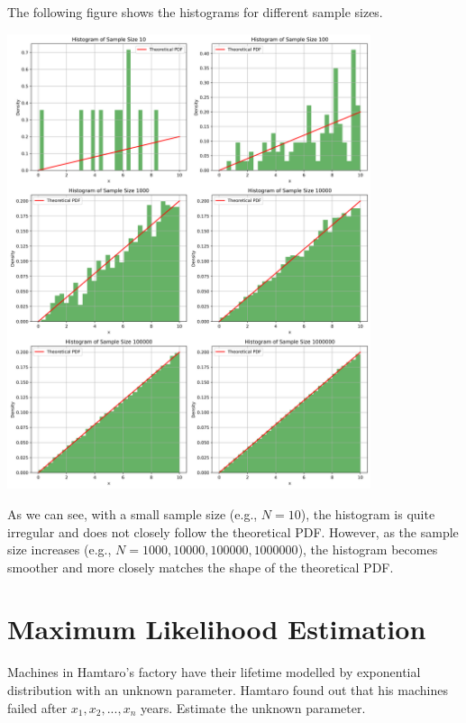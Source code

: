 \documentclass[a4paper, 10pt]{article}
\begin{document}
\begin{solution}
The following figure shows the histograms for different sample sizes.
\begin{center}
    \includegraphics[width=0.8\textwidth]{images/sampling_increasing_grid.png}
\end{center}

As we can see, with a small sample size (e.g., \( N = 10 \)), the histogram is quite irregular and does not closely follow the theoretical PDF.
However, as the sample size increases (e.g., \( N = 1000, 10000, 100000, 1000000 \)), the histogram becomes smoother and more closely matches the shape of the theoretical PDF.
\end{solution}

\newpage

\section{Maximum Likelihood Estimation}


\begin{problem}
Machines in Hamtaro's factory have their lifetime modelled by exponential distribution with an unknown parameter.
Hamtaro found out that his machines failed after \( x_1, x_2, ..., x_n \) years. Estimate the unknown parameter.
\end{problem}
\end{document}
